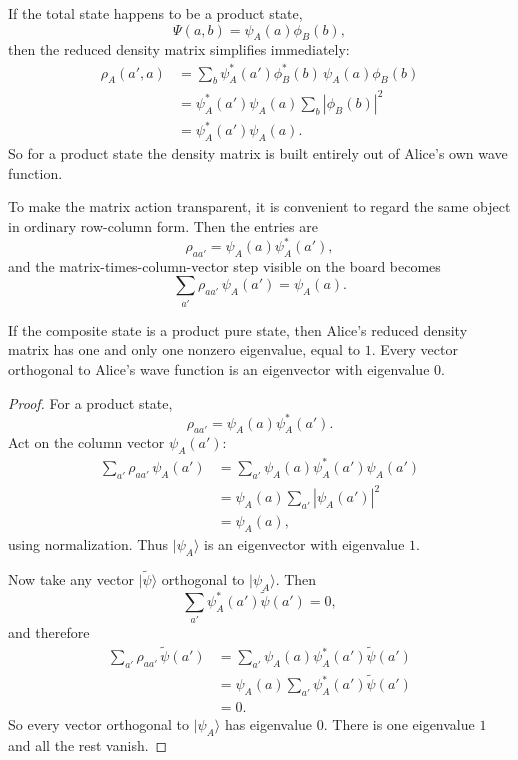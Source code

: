 If the total state happens to be a product state,
\[
\Psi(a,b)=\psi_A(a)\phi_B(b),
\]
then the reduced density matrix simplifies immediately:
\begin{align}
\rho_A(a',a)
&=
\sum_b \psi_A^*(a')\phi_B^*(b)\,\psi_A(a)\phi_B(b) \\
&=
\psi_A^*(a')\psi_A(a)\sum_b |\phi_B(b)|^2 \\
&=
\psi_A^*(a')\psi_A(a).
\end{align}
So for a product state the density matrix is built entirely out of Alice's own wave function.

To make the matrix action transparent, it is convenient to regard the same object in ordinary row-column form. Then the entries are
\begin{equation}
\rho_{aa'}=\psi_A(a)\psi_A^*(a'),
\end{equation}
and the matrix-times-column-vector step visible on the board becomes
\begin{equation}
\sum_{a'}\rho_{aa'}\,\psi_A(a')=\psi_A(a).
\end{equation}

\begin{proposition}
If the composite state is a product pure state, then Alice's reduced density matrix has one and only one nonzero eigenvalue, equal to $1$. Every vector orthogonal to Alice's wave function is an eigenvector with eigenvalue $0$.
\end{proposition}

\begin{proof}
For a product state,
\[
\rho_{aa'}=\psi_A(a)\psi_A^*(a').
\]
Act on the column vector $\psi_A(a')$:
\begin{align}
\sum_{a'}\rho_{aa'}\,\psi_A(a')
&=
\sum_{a'}\psi_A(a)\psi_A^*(a')\psi_A(a') \\
&=
\psi_A(a)\sum_{a'}|\psi_A(a')|^2 \\
&=
\psi_A(a),
\end{align}
using normalization. Thus $|\psi_A\rangle$ is an eigenvector with eigenvalue $1$.

Now take any vector $|\widetilde\psi\rangle$ orthogonal to $|\psi_A\rangle$. Then
\[
\sum_{a'}\psi_A^*(a')\widetilde\psi(a')=0,
\]
and therefore
\begin{align}
\sum_{a'}\rho_{aa'}\,\widetilde\psi(a')
&=
\sum_{a'}\psi_A(a)\psi_A^*(a')\widetilde\psi(a') \\
&=
\psi_A(a)\sum_{a'}\psi_A^*(a')\widetilde\psi(a') \\
&=
0.
\end{align}
So every vector orthogonal to $|\psi_A\rangle$ has eigenvalue $0$. There is one eigenvalue $1$ and all the rest vanish.
\end{proof}

